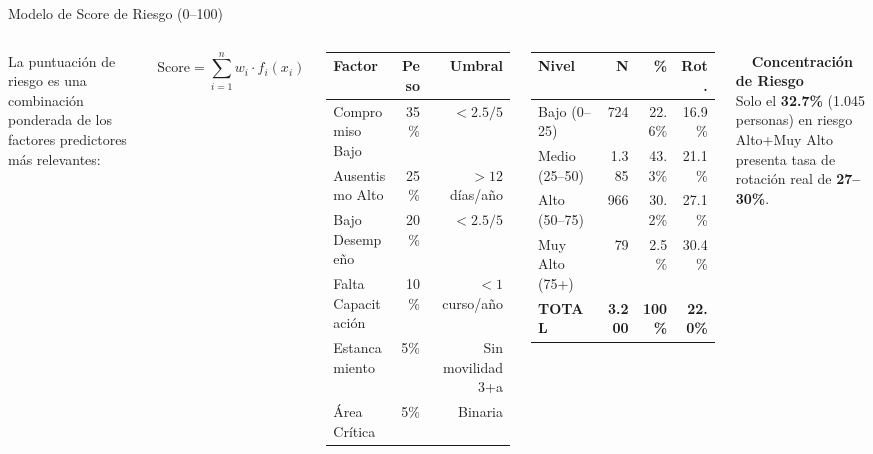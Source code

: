 \documentclass[aspectratio=169,12pt]{beamer}
\newcommand{\hallabox}[3]{%
  \begin{tcolorbox}[
    enhanced,
    colback=White,
    colframe=#1,
    arc=3pt,
    boxrule=1pt,
    borderline west={3pt}{0pt}{#1},
    left=6pt, right=4pt, top=3pt, bottom=3pt
  ]
    {\color{#1}\small\bfseries #2}\\[-2pt]
    {\small #3}
  \end{tcolorbox}%
}
\begin{document}
\begin{frame}[shrink=10]{Modelo de Score de Riesgo (0--100)}
  \begin{columns}[T]
      {\footnotesize La puntuación de riesgo es una combinación ponderada de los
      factores predictores más relevantes:}
      \vspace{1pt}

      \[
      \textstyle\text{Score} = \sum_{i=1}^{n} w_i \cdot f_i(x_i)
      \]

      \vspace{1pt}
      \footnotesize
      \begin{tabular}{@{}lrr@{}}
        \toprule
        \rowcolor{NavyDeep}\color{White}\textbf{Factor} &
          \color{White}\textbf{Peso} &
          \color{White}\textbf{Umbral} \\
        \midrule
        \rowcolor{RedRisk!15}Compromiso Bajo & 35\% & $<2.5/5$ \\
        \rowcolor{Amber!15}  Ausentismo Alto & 25\% & $>12$ días/año \\
        \rowcolor{Gold!15}   Bajo Desempeño  & 20\% & $<2.5/5$ \\
        Falta Capacitación   & 10\% & $<1$ curso/año \\
        \rowcolor{GrayLight} Estancamiento   &  5\% & Sin movilidad 3+a \\
        Área Crítica         &  5\% & Binaria \\
        \bottomrule
      \end{tabular}

      \vspace{1pt}
      \footnotesize
      \begin{tabular}{@{}lrrr@{}}
        \toprule
        \rowcolor{NavyDeep}
          \color{White}\textbf{Nivel} &
          \color{White}\textbf{N} &
          \color{White}\textbf{\%} &
          \color{White}\textbf{Rot.} \\
        \midrule
        \rowcolor{GreenOK!15}  Bajo (0--25)   &   724 & 22.6\% & 16.9\% \\
        \rowcolor{Gold!15}     Medio (25--50) & 1.385 & 43.3\% & 21.1\% \\
        \rowcolor{Amber!20}    Alto (50--75)  &   966 & 30.2\% & 27.1\% \\
        \rowcolor{RedRisk!20}  Muy Alto (75+) &    79 &  2.5\% & 30.4\% \\
        \midrule
        \textbf{TOTAL} & \textbf{3.200} & \textbf{100\%} & \textbf{22.0\%} \\
        \bottomrule
      \end{tabular}
      \vspace{2pt}
      \hallabox{RedRisk}{\faFire\ \ Concentración de Riesgo}{%
        \footnotesize Solo el \textbf{32.7\%} (1.045 personas) en riesgo
        Alto+Muy Alto presenta tasa de rotación real de \textbf{27--30\%}.}
  \end{columns}
\end{frame}
\end{document}

